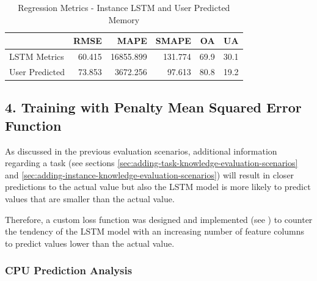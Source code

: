       \begin{table}
        \centering
        \caption{Regression Metrics - Instance LSTM and User Predicted Memory}
        \label{tab:regression-metrics-instance-lstm-user-predicted-memory}

        \begin{tabular}{|l|rrrrr|}
          \toprule
          {} &    RMSE &       MAPE &    SMAPE &    OA &    UA \\
          \midrule
          LSTM Metrics   &  60.415 &  16855.899 &  131.774 &  69.9 &  30.1 \\
          User Predicted &  73.853 &   3672.256 &   97.613 &  80.8 &  19.2 \\
          \bottomrule
          \end{tabular}
      \end{table}

  \subsection*{4. Training with Penalty Mean Squared Error Function}
  \label{sec:training-with-custom-loss-function-evaluation-scenarios}

      As discussed in the previous evaluation scenarios, 
      additional information regarding a task (see sections \ref{sec:adding-task-knowledge-evaluation-scenarios} and \ref{sec:adding-instance-knowledge-evaluation-scenarios}) will result in closer predictions to the actual value but also the LSTM model is more likely to predict values that are smaller than the actual value.
      
      Therefore, a custom loss function was designed and implemented (see ) to counter the tendency of the LSTM model with an increasing number of feature columns to predict values lower than the actual value.


    \subsubsection{CPU Prediction Analysis}
    \label{sec:cpu-prediction-analysis-pmse-lstm-evaluation}

